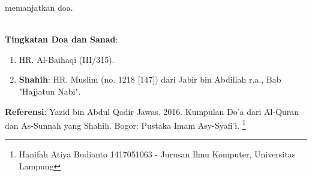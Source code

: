 \documentclass[a4paper,12pt]{article}
\begin{document}
memanjatkan doa.\\\\
\par
\noindent
\textbf{Tingkatan Doa dan Sanad}:
\begin{enumerate}
\item HR. Al-Baihaqi (III/315).
\item \textbf{Shahih}: HR. Muslim (no. 1218 [147]) dari Jabir bin Abdillah 
r.a., Bab "Hajjatun Nabi".
\end{enumerate}
\textbf{Referensi}: Yazid bin Abdul Qadir Jawas. 2016. Kumpulan Do'a dari
Al-Quran dan As-Sunnah yang Shahih. Bogor: Pustaka Imam Asy-Syafi'i.
\footnote{Hanifah Atiya Budianto 1417051063 - Jurusan Ilmu Komputer,
Universitas Lampung}
\end{document}

